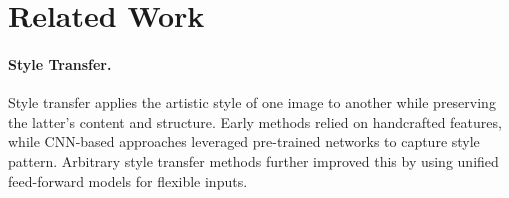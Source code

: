 \section{Related Work}
\paragraph{\textbf{Style Transfer.}}



Style transfer \cite{zhang2019multimodal,wang2020diversified,wang2020collaborative,park2019arbitrary,lu2019closed,li2018closed,li2017universal,lai2017deep,gatys2016image} applies the artistic style of one image to another while preserving the latter's content and structure. Early methods \cite{zhang2013style,wang2004efficient} relied on handcrafted features, while CNN-based approaches \cite{gatys2016image, gatys2017controlling, kolkin2019style} leveraged pre-trained networks to capture style pattern. Arbitrary style transfer methods \cite{deng2020arbitrary,huang2017arbitrary,liao2017visual,zhang2022exact} further improved this by using unified feed-forward models for flexible inputs.




